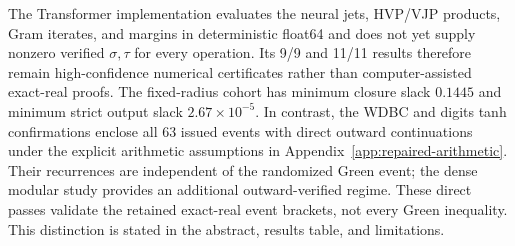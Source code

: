 The Transformer implementation evaluates the neural jets, HVP/VJP products,
Gram iterates, and margins in deterministic float64 and does not yet supply
nonzero verified $\sigma,\tau$ for every operation.  Its 9/9 and 11/11 results
therefore remain high-confidence numerical certificates rather than
computer-assisted exact-real proofs.  The fixed-radius cohort has minimum
closure slack $0.1445$ and minimum strict output slack
$2.67\times10^{-5}$.  In contrast, the WDBC and digits tanh
confirmations enclose all 63 issued events with direct outward continuations
under the explicit arithmetic assumptions in Appendix~\ref{app:repaired-arithmetic}.
Their recurrences are independent of the randomized Green event;
the dense modular study provides an additional outward-verified regime.  These
direct passes validate the retained exact-real event brackets, not every Green
inequality.  This distinction is stated in the abstract, results table, and
limitations.
